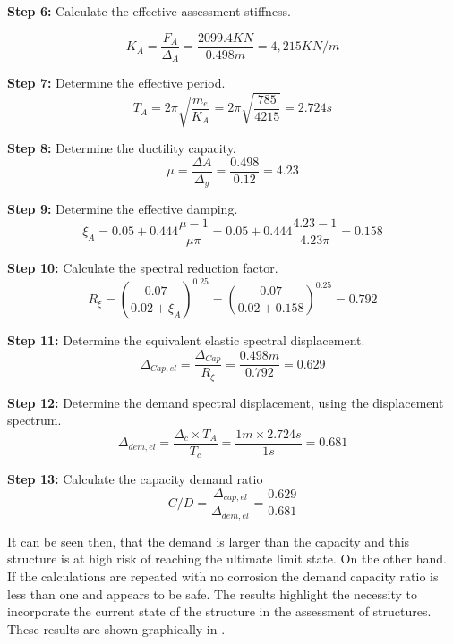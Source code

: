 \textbf{Step 6:} Calculate the effective assessment stiffness.

\begin{displaymath}
    K_{A}=\frac{F_{A}}{\Delta_{A}}=\frac{2099.4 KN}{0.498 m}=4,215 KN/m
\end{displaymath}

\textbf{Step 7:} Determine the effective period.
\begin{displaymath}
    T_{A}=2\pi \sqrt{\frac{m_e}{K_A}}=2\pi \sqrt{\frac{785}{4215}}=2.724 s
\end{displaymath}

\textbf{Step 8:} Determine the ductility capacity.
\begin{displaymath}
    \mu = \frac{\Delta{A}}{\Delta_{y}} = \frac{0.498}{0.12} = 4.23
\end{displaymath}

\textbf{Step 9:} Determine the effective damping.
\begin{displaymath}
    \xi_{A}=0.05+0.444\frac{\mu-1}{\mu\pi}=0.05+0.444\frac{4.23-1}{4.23\pi}=0.158
\end{displaymath}

\textbf{Step 10:} Calculate the spectral reduction factor.
\begin{displaymath}
     R_{\xi}=\left(\frac{0.07}{0.02+\xi_{A}}\right)^{0.25}=\left(\frac{0.07}{0.02+0.158}\right)^{0.25}=0.792
\end{displaymath}

\textbf{Step 11:} Determine the equivalent elastic spectral displacement.
\begin{displaymath}
     \Delta_{Cap,el}=\frac{\Delta_{Cap}}{R_{\xi}}=\frac{0.498m}{0.792}=0.629
\end{displaymath}

\textbf{Step 12:} Determine the demand spectral displacement, using the displacement spectrum.
\begin{displaymath}
     \Delta_{dem,el}=\frac{\Delta_{c} \times T_{A}}{T_{c}}=\frac{1m \times 2.724s}{1s}=0.681
\end{displaymath}

\textbf{Step 13:} Calculate the capacity demand ratio
\begin{displaymath}
     C/D= \frac{\Delta_{cap,el}}{\Delta_{dem,el}}= \frac{0.629}{0.681}
\end{displaymath}

It can be seen then, that the demand is larger than the capacity and this structure is at high risk of reaching the ultimate limit state. On the other hand. If the calculations are repeated with no corrosion the demand capacity ratio is less than one and appears to be safe. The results highlight the necessity to incorporate the current state of the structure in the assessment of structures. These results are shown graphically in .

